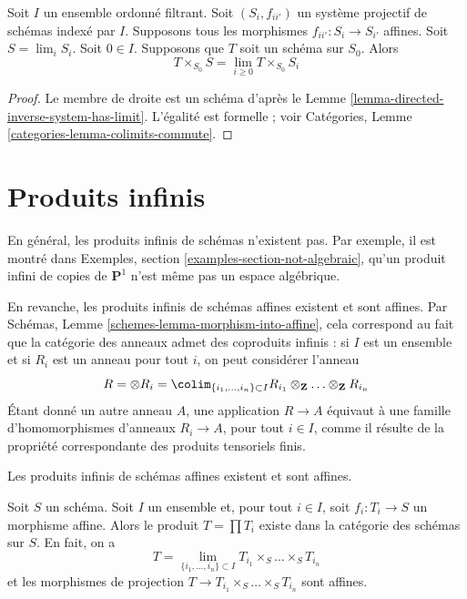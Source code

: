 \begin{lemma}
\label{lemma-scheme-over-limit}
Soit $I$ un ensemble ordonné filtrant.
Soit $(S_i, f_{ii'})$ un système projectif de schémas indexé par $I$.
Supposons tous les morphismes $f_{ii'} : S_i \to S_{i'}$ affines.
Soit $S = \lim_i S_i$. Soit $0 \in I$. Supposons que $T$ soit un schéma
sur $S_0$. Alors
$$
T \times_{S_0} S = \lim_{i \geq 0} T \times_{S_0} S_i
$$
\end{lemma}

\begin{proof}
Le membre de droite est un schéma d'après le
Lemme \ref{lemma-directed-inverse-system-has-limit}. L'égalité est formelle ;
voir Catégories, Lemme \ref{categories-lemma-colimits-commute}.
\end{proof}



\section{Produits infinis}
\label{section-inifinite-products}

\noindent
En général, les produits infinis de schémas n'existent pas. Par exemple,
il est montré dans Exemples, section \ref{examples-section-not-algebraic},
qu'un produit infini de copies de $\mathbf{P}^1$ n'est même pas un espace
algébrique.

\medskip\noindent
En revanche, les produits infinis de schémas affines existent et sont
affines. Par Schémas, Lemme \ref{schemes-lemma-morphism-into-affine}, cela
correspond au fait que la catégorie des anneaux admet des coproduits
infinis : si $I$ est un ensemble et si $R_i$ est un anneau pour tout $i$,
on peut considérer l'anneau
$$
R = \otimes R_i =
\colim_{\{i_1, \ldots, i_n\} \subset I}
R_{i_1} \otimes_\mathbf{Z} \ldots \otimes_\mathbf{Z} R_{i_n}
$$
Étant donné un autre anneau $A$, une application $R \to A$ équivaut à une
famille d'homomorphismes d'anneaux $R_i \to A$, pour tout $i \in I$, comme
il résulte de la propriété correspondante des produits tensoriels finis.

\begin{lemma}
\label{lemma-infinite-product}
\begin{slogan}
Les produits infinis de schémas affines existent et sont affines.
\end{slogan}
Soit $S$ un schéma. Soit $I$ un ensemble et, pour tout $i \in I$, soit
$f_i : T_i \to S$ un morphisme affine. Alors le produit $T = \prod T_i$
existe dans la catégorie des schémas sur $S$. En fait, on a
$$
T = \lim_{\{i_1, \ldots, i_n\} \subset I}
T_{i_1} \times_S \ldots \times_S T_{i_n}
$$
et les morphismes de projection
$T \to T_{i_1} \times_S \ldots \times_S T_{i_n}$ sont affines.
\end{lemma}

